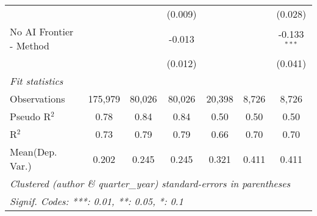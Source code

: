 \begin{tabular}{lcccccc}
                           &               &               & (0.009)       &               &                & (0.028)\\   
   No AI Frontier - Method &               &               & -0.013        &               &                & -0.133$^{***}$\\   
                           &               &               & (0.012)       &               &                & (0.041)\\   
   \midrule
   \emph{Fit statistics}\\
   Observations            & 175,979       & 80,026        & 80,026        & 20,398        & 8,726          & 8,726\\  
   Pseudo R$^2$            & 0.78          & 0.84          & 0.84          & 0.50          & 0.50           & 0.50\\  
   R$^2$                   & 0.73          & 0.79          & 0.79          & 0.66          & 0.70           & 0.70\\  
Mean(Dep. Var.) & 0.202 & 0.245 & 0.245 & 0.321 & 0.411 & 0.411 \\
   \midrule \midrule
   \multicolumn{7}{l}{\emph{Clustered (author \& quarter\_year) standard-errors in parentheses}}\\
   \multicolumn{7}{l}{\emph{Signif. Codes: ***: 0.01, **: 0.05, *: 0.1}}\\
\end{tabular}
\par\endgroup
